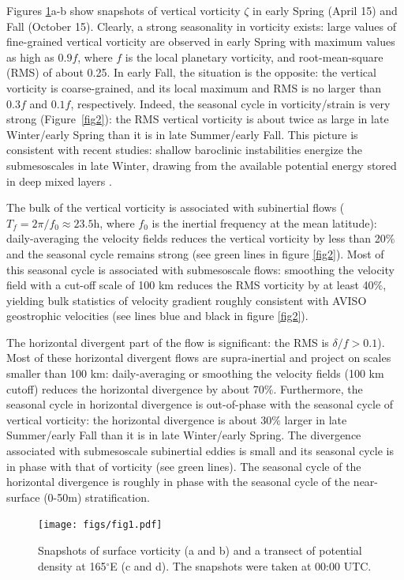 \documentclass[grl]{agutex2015}
\begin{document}
\begin{article}
Figures \ref{fig1}a-b show snapshots of vertical vorticity $\zeta$ in early Spring
(April 15) and Fall (October 15). Clearly, a strong seasonality in vorticity
exists: large values of fine-grained vertical vorticity are
observed in early Spring with maximum values as high as $0.9f$, where $f$ is
the local planetary vorticity, and root-mean-square (RMS) of about 0.25. In early
Fall, the situation is the opposite: the vertical vorticity is coarse-grained,
and its local maximum and RMS is no larger than $0.3f$ and $0.1f$, respectively.
Indeed, the seasonal cycle in vorticity/strain is very strong (Figure~\ref{fig2}):
the RMS vertical vorticity is about twice as large in late Winter/early Spring
than it is in late Summer/early Fall. This picture is consistent with
recent studies: shallow baroclinic instabilities energize the submesoscales
in late Winter, drawing from the available potential energy stored in deep mixed
layers \citep{sasaki_etal2014,callies_etal2015,callies_etal2016}.

The bulk of the vertical vorticity is associated with subinertial flows
($T_f = 2\pi/f_0\approx 23.5$h, where $f_0$ is the inertial frequency at
the mean latitude): daily-averaging the velocity fields reduces the vertical
vorticity by less than 20$\%$ and the seasonal cycle remains strong (see
green lines in figure \ref{fig2}). Most of this seasonal cycle is associated
with submesoscale flows: smoothing the velocity field
with a cut-off scale of 100 km reduces the RMS vorticity by at least 40$\%$,
yielding bulk statistics of velocity gradient roughly consistent with AVISO
geostrophic velocities (see lines blue and black in figure \ref{fig2}).

The horizontal divergent part of the flow is significant: the RMS is $\delta/f > 0.1$).
Most of these horizontal divergent flows are supra-inertial and project
on scales smaller than 100 km: daily-averaging or smoothing the velocity fields
 (100 km cutoff) reduces the horizontal divergence by about 70$\%$.
Furthermore, the seasonal cycle in horizontal divergence is out-of-phase with the
seasonal cycle of vertical vorticity: the horizontal divergence is about 30$\%$ larger in late
Summer/early Fall than it is in late Winter/early Spring. The divergence associated
with submesoscale subinertial eddies is small and its seasonal cycle is in phase
with that of vorticity (see green lines).  The seasonal cycle of the horizontal
divergence is roughly in phase with the seasonal cycle of the near-surface (0-50m)
stratification.
\begin{figure}[ht]
\begin{center}
\texttt{[image: figs/fig1.pdf]}
 \caption{Snapshots of surface vorticity (a and b) and a transect
          of potential density at 165$^\circ$E (c and d). The snapshots were
          taken at 00:00 UTC.}
\vspace{-1.5cm}
 \label{fig1}
 \end{center}
 \end{figure}


\end{article}
\end{document}
